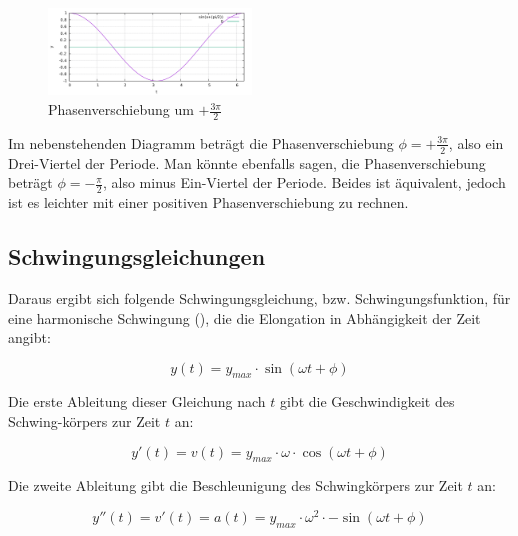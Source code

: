 	\begin{figure} \label{phasenverschiebung}
	
		\vspace{-10pt}
		\includegraphics[width=0.48\textwidth]{Pictures/phasenverschiebung}
		\vspace{-13pt}
		\caption{Phasenverschiebung um $+\frac{3\pi}{2}$}
		\vspace{-5pt}
	
	\end{figure}

Im nebenstehenden Diagramm beträgt die Phasenverschiebung $\phi = +\frac{3\pi}{2}$, also ein Drei-Viertel der Periode. Man könnte ebenfalls sagen, die Phasenverschiebung beträgt $\phi = -\frac{\pi}{2}$, also minus Ein-Viertel der Periode. Beides ist äquivalent, jedoch ist es leichter mit einer positiven Phasenverschiebung zu rechnen.
	
	


\subsection{Schwingungsgleichungen} \label{subsec:schwingungsgleichungen}

Daraus ergibt sich folgende Schwingungsgleichung, bzw. Schwingungsfunktion, für eine harmonische Schwingung (), die die Elongation in Abhängigkeit der Zeit angibt:

\begin{equation} \label{eq:schwingungsgleichung_y}
	y(t)=y_{max} \cdot \sin{(\omega t + \phi)}
\end{equation}

Die erste Ableitung dieser Gleichung nach $t$ gibt die Geschwindigkeit des Schwing-körpers zur Zeit $t$ an:

\begin{equation} \label{eq:schwingungsgleichung_v}
	y'(t)=v(t)=y_{max} \cdot \omega \cdot \cos{(\omega t + \phi)}
\end{equation}

Die zweite Ableitung gibt die Beschleunigung des Schwingkörpers zur Zeit $t$ an:

\begin{equation} \label{eq:schwingungsgleichung_a}
	y''(t)=v'(t)=a(t)=y_{max} \cdot \omega^{2} \cdot -\sin{(\omega t + \phi)}
\end{equation}


